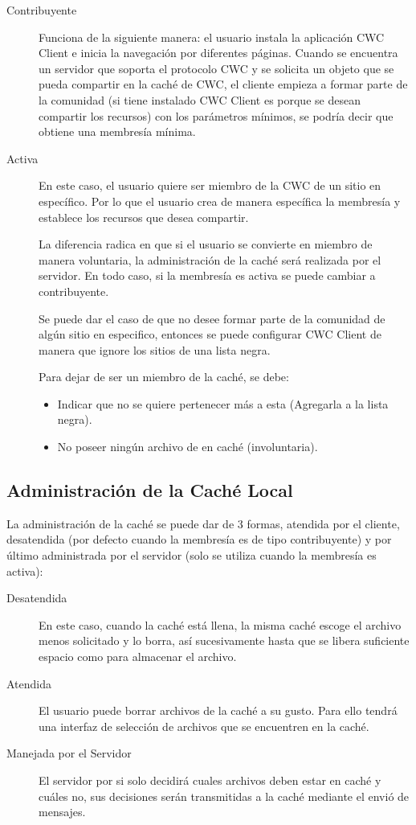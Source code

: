 \begin{description}
\item[Contribuyente] Funciona de la siguiente manera: el usuario instala la aplicación CWC Client e inicia la navegación por diferentes páginas. Cuando se encuentra un servidor que soporta el protocolo CWC y se solicita un objeto que se pueda compartir en la caché de CWC, el cliente empieza a formar parte de la comunidad (si tiene instalado CWC Client es porque se desean compartir los recursos) con los parámetros mínimos, se podría decir que obtiene una membresía mínima.

\item[Activa] En este caso, el usuario quiere ser miembro de la CWC de un sitio en específico. Por lo que el usuario crea de manera específica la membresía y establece los recursos que desea compartir.

La diferencia radica en que si el usuario se convierte en miembro de manera voluntaria, la administración de la caché será realizada por el servidor. En todo caso, si la membresía es activa se puede cambiar a contribuyente.

Se puede dar el caso de que no desee formar parte de la comunidad de algún sitio en especifico, entonces se puede configurar CWC Client de manera que ignore los sitios de una lista negra.

Para dejar de ser un miembro de la caché, se debe:

\begin{itemize}
\item Indicar que no se quiere pertenecer más a esta (Agregarla a la lista negra).
\item No poseer ningún archivo de en caché (involuntaria).
\end{itemize}

\end{description}


\subsection{Administración de la Caché Local}

La administración de la caché se puede dar de 3 formas, atendida por el cliente, desatendida (por defecto cuando la membresía es de tipo contribuyente) y por último administrada por el servidor (solo se utiliza cuando la membresía es activa):

\begin{description}
\item[Desatendida] En este caso, cuando la caché está llena, la misma caché escoge el archivo menos solicitado y lo borra, así sucesivamente hasta que se libera suficiente espacio como para almacenar el archivo. 
\item[Atendida] El usuario puede borrar archivos de la caché a su gusto. Para ello tendrá una interfaz de selección de archivos que se encuentren en la caché.
\item[Manejada por el Servidor] El servidor por si solo decidirá cuales archivos deben estar en caché y cuáles no, sus decisiones serán transmitidas a la caché mediante el envió de mensajes. 
\end{description}


